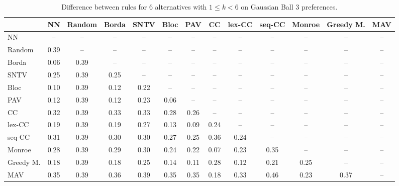 
\begin{table*}[h!]
\centering
\begin{tabular}{lcccccccccccc}
\toprule
 & NN & Random & Borda & SNTV & Bloc & PAV & CC & lex-CC & seq-CC & Monroe & Greedy M. & MAV \\
\midrule
NN & -- & -- & -- & -- & -- & -- & -- & -- & -- & -- & -- & -- \\
Random & 0.39 & -- & -- & -- & -- & -- & -- & -- & -- & -- & -- & -- \\
Borda & 0.06 & 0.39 & -- & -- & -- & -- & -- & -- & -- & -- & -- & -- \\
SNTV & 0.25 & 0.39 & 0.25 & -- & -- & -- & -- & -- & -- & -- & -- & -- \\
Bloc & 0.10 & 0.39 & 0.12 & 0.22 & -- & -- & -- & -- & -- & -- & -- & -- \\
PAV & 0.12 & 0.39 & 0.12 & 0.23 & 0.06 & -- & -- & -- & -- & -- & -- & -- \\
CC & 0.32 & 0.39 & 0.33 & 0.33 & 0.28 & 0.26 & -- & -- & -- & -- & -- & -- \\
lex-CC & 0.19 & 0.39 & 0.19 & 0.27 & 0.13 & 0.09 & 0.24 & -- & -- & -- & -- & -- \\
seq-CC & 0.31 & 0.39 & 0.30 & 0.30 & 0.27 & 0.25 & 0.36 & 0.24 & -- & -- & -- & -- \\
Monroe & 0.28 & 0.39 & 0.29 & 0.30 & 0.24 & 0.22 & 0.07 & 0.23 & 0.35 & -- & -- & -- \\
Greedy M. & 0.18 & 0.39 & 0.18 & 0.25 & 0.14 & 0.11 & 0.28 & 0.12 & 0.21 & 0.25 & -- & -- \\
MAV & 0.35 & 0.39 & 0.36 & 0.39 & 0.35 & 0.35 & 0.18 & 0.33 & 0.46 & 0.23 & 0.37 & -- \\
\bottomrule
\end{tabular}

\caption{Difference between rules for 6 alternatives with $1 \leq k < 6$ on Gaussian Ball 3 preferences.}
\end{table*}
